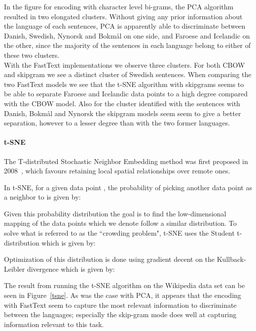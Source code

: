 \documentclass[11pt,a4paper]{article}
\begin{document}
In the figure for encoding with character level bi-grams, the PCA algorithm resulted in two elongated clusters. Without giving any prior information about the language of each sentences, PCA is apparently able to discriminate between Danish, Swedish, Nynorsk and Bokmål on one side, and Faroese and Icelandic on the other, since the majority of the sentences in each language belong to either of these two clusters. \\

With the FastText implementations we observe three clusters. For both CBOW and skipgram we see a distinct cluster of Swedish sentences. When comparing the two FastText models we see that the t-SNE algorithm with skipgrams seems to be able to separate  Faroese and Icelandic data points to a high degree compared with the CBOW model. Also for the cluster identified with the sentences with Danish, Bokmål and Nynorsk the skipgram models seem seem to give a better separation, however to a lesser degree than with the two former languages.

\paragraph{t-SNE}

The T-distributed Stochastic Neighbor Embedding method was first proposed in 2008~\cite{tsne}, which favours retaining local spatial relationships over remote ones.

In t-SNE, for a given data point , the probability of picking another data point  as a neighbor to  is given by:



Given this probability distribution the goal is to find the low-dimensional mapping of the data points  which we denote  follow a similar distribution. To solve what is referred to as the ``crowding problem", t-SNE uses the Student t-distribution which is given by:



Optimization of this distribution is done using gradient decent on the Kullback-Leibler divergence which is given by:



The result from running the t-SNE algorithm on the Wikipedia data set can be seen in Figure~\ref{tsne}. As was the case with PCA,  it appears that the encoding with FastText seem to capture the most relevant information to discriminate between the languages; especially the skip-gram mode does well at capturing information relevant to this task.
\end{document}
